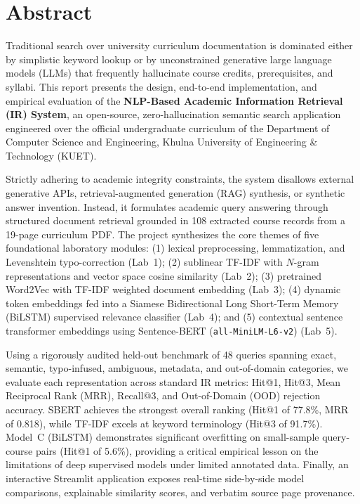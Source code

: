 \documentclass[12pt,a4paper]{report}
\begin{document}
\chapter*{Abstract}

Traditional search over university curriculum documentation is dominated either by simplistic keyword lookup or by unconstrained generative large language models (LLMs) that frequently hallucinate course credits, prerequisites, and syllabi. This report presents the design, end-to-end implementation, and empirical evaluation of the \textbf{NLP-Based Academic Information Retrieval (IR) System}, an open-source, zero-hallucination semantic search application engineered over the official undergraduate curriculum of the Department of Computer Science and Engineering, Khulna University of Engineering \& Technology (KUET).

Strictly adhering to academic integrity constraints, the system disallows external generative APIs, retrieval-augmented generation (RAG) synthesis, or synthetic answer invention. Instead, it formulates academic query answering through structured document retrieval grounded in 108 extracted course records from a 19-page curriculum PDF. The project synthesizes the core themes of five foundational laboratory modules: (1) lexical preprocessing, lemmatization, and Levenshtein typo-correction (Lab~1); (2) sublinear TF-IDF with $N$-gram representations and vector space cosine similarity (Lab~2); (3) pretrained Word2Vec with TF-IDF weighted document embedding (Lab~3); (4) dynamic token embeddings fed into a Siamese Bidirectional Long Short-Term Memory (BiLSTM) supervised relevance classifier (Lab~4); and (5) contextual sentence transformer embeddings using Sentence-BERT (\texttt{all-MiniLM-L6-v2}) (Lab~5).

Using a rigorously audited held-out benchmark of 48 queries spanning exact, semantic, typo-infused, ambiguous, metadata, and out-of-domain categories, we evaluate each representation across standard IR metrics: Hit@1, Hit@3, Mean Reciprocal Rank (MRR), Recall@3, and Out-of-Domain (OOD) rejection accuracy. SBERT achieves the strongest overall ranking (Hit@1 of 77.8\%, MRR of 0.818), while TF-IDF excels at keyword terminology (Hit@3 of 91.7\%). Model~C (BiLSTM) demonstrates significant overfitting on small-sample query-course pairs (Hit@1 of 5.6\%), providing a critical empirical lesson on the limitations of deep supervised models under limited annotated data. Finally, an interactive Streamlit application exposes real-time side-by-side model comparisons, explainable similarity scores, and verbatim source page provenance.
\end{document}
